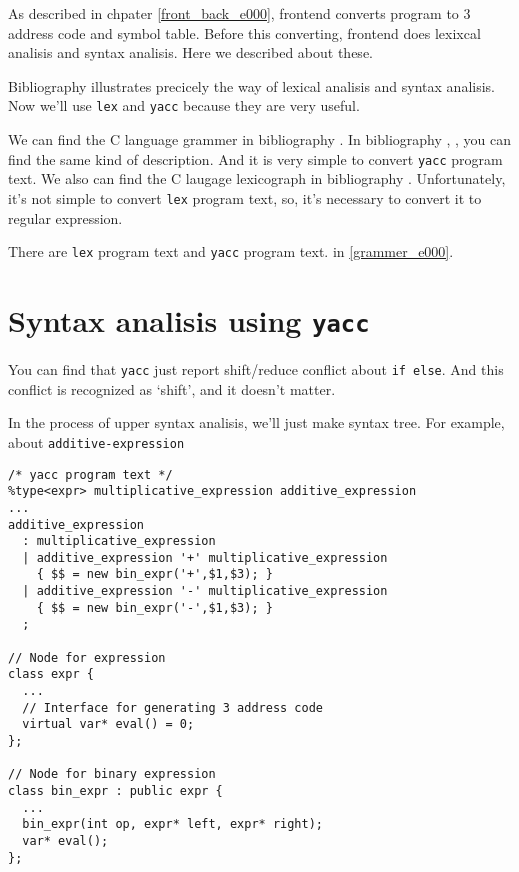 \label{lex_yacc_e000}
As described in chpater \ref{front_back_e000}, frontend
converts program to 3 address code and symbol table.
Before this converting, frontend does lexixcal analisis
and syntax analisis. Here we described about these.

Bibliography \cite{doragon} illustrates precicely
the way of lexical analisis and syntax analisis.
Now we'll use {\tt{lex}} and {\tt{yacc}} because
they are very useful.

We can find the C language grammer in bibliography \cite{ISO}.
In bibliography \cite{KR}, \cite{SGS}, you can find 
the same kind of description.
And it is very simple to convert {\tt{yacc}} program text.
We also can find the C laugage lexicograph in bibliography \cite{ISO}.
Unfortunately, it's not simple to convert {\tt{lex}} program text, so,
it's necessary to convert it to regular expression.
\begin{htmlonly}
There are  {\tt{lex}} program text and {\tt{yacc}} program text.
in \ref{grammer_e000}.
\end{htmlonly}

\section{Syntax analisis using {\tt{yacc}} }

\label{lex_yacc_e003}
You can find that {\tt{yacc}} just report shift/reduce conflict about
{\tt{if else}}. And this conflict is recognized as `shift', and it doesn't
matter.

In the process of upper syntax analisis, we'll just make
syntax tree. For example, about {\tt{additive-expression}}

\begin{verbatim}
/* yacc program text */
%type<expr> multiplicative_expression additive_expression
...
additive_expression
  : multiplicative_expression
  | additive_expression '+' multiplicative_expression
    { $$ = new bin_expr('+',$1,$3); }
  | additive_expression '-' multiplicative_expression
    { $$ = new bin_expr('-',$1,$3); }
  ;

// Node for expression
class expr {
  ...
  // Interface for generating 3 address code
  virtual var* eval() = 0;
};

// Node for binary expression
class bin_expr : public expr {
  ...
  bin_expr(int op, expr* left, expr* right);
  var* eval();
};
\end{verbatim}

